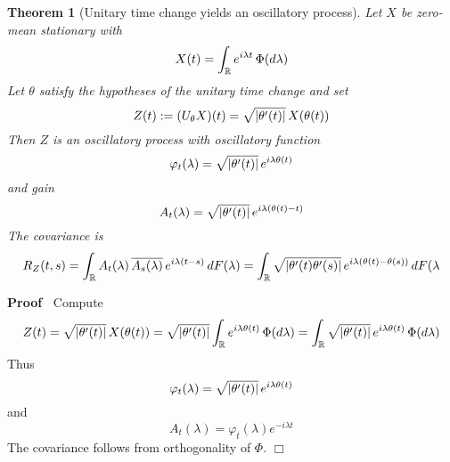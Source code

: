 \documentclass{article}
\newcommand{\assign}{:=}
\newenvironment{proof}{\noindent\textbf{Proof\ }}{\hspace*{\fill}$\Box$\medskip}
\newtheorem{theorem}{Theorem}
\begin{document}
\begin{theorem}
  [Unitary time change yields an oscillatory process] Let $X$ be zero-mean
  stationary with
  \begin{equation}
    X (t) = \int_{\mathbb{R}} e^{i \lambda t}  \hspace{0.17em} \Phi (d
    \lambda)
  \end{equation}
  Let $\theta$ satisfy the hypotheses of the unitary time change and set
  \begin{equation}
    Z (t) \assign (U_{\theta} X) (t) = \sqrt{| \theta' (t) |}  \hspace{0.17em}
    X (\theta (t))
  \end{equation}
  Then $Z$ is an oscillatory process with oscillatory function
  \begin{equation}
    \varphi_t (\lambda) = \sqrt{| \theta' (t) |}  \hspace{0.17em} e^{i \lambda
    \theta (t)}
  \end{equation}
  and gain
  \begin{equation}
    A_t (\lambda) = \sqrt{| \theta' (t) |}  \hspace{0.17em} e^{i \lambda
    (\theta (t) - t)}
  \end{equation}
  The covariance is
  \begin{equation}
    R_Z (t, s) = \int_{\mathbb{R}} A_t (\lambda) \hspace{0.17em} \overline{A_s
    (\lambda)} \hspace{0.17em} e^{i \lambda (t - s)}  \hspace{0.17em} dF
    (\lambda) = \int_{\mathbb{R}} \sqrt{| \theta' (t) \theta' (s) |} 
    \hspace{0.17em} e^{i \lambda (\theta (t) - \theta (s))}  \hspace{0.17em}
    dF (\lambda
  \end{equation}
\end{theorem}

\begin{proof}
  Compute
  \begin{equation}
    Z (t) = \sqrt{| \theta' (t) |}  \hspace{0.17em} X (\theta (t)) = \sqrt{|
    \theta' (t) |}  \int_{\mathbb{R}} e^{i \lambda \theta (t)} 
    \hspace{0.17em} \Phi (d \lambda) = \int_{\mathbb{R}} \sqrt{| \theta' (t)
    |}  \hspace{0.17em} e^{i \lambda \theta (t)}  \hspace{0.17em} \Phi (d
    \lambda)
  \end{equation}
  Thus
  \begin{equation}
    \varphi_t (\lambda) = \sqrt{| \theta' (t) |}  \hspace{0.17em} e^{i \lambda
    \theta (t)}
  \end{equation}
  and
  \begin{equation}
    A_t (\lambda) = \varphi_t (\lambda) e^{- i \lambda t}
  \end{equation}
  The covariance follows from orthogonality of $\Phi$.
\end{proof}
\end{document}
